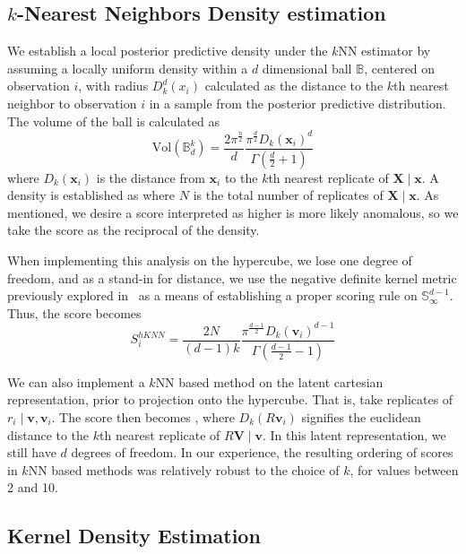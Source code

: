 \subsection{$k$-Nearest Neighbors Density estimation}
We establish a local posterior predictive density under the $k$NN estimator by 
  assuming a locally uniform density within a $d$ dimensional ball $\mathbb{B}$, 
  centered on observation $i$, with radius $D_{k}^d(x_i)$ calculated as the 
  distance to the $k$th nearest neighbor to observation $i$ in a sample from the 
  posterior predictive distribution. The volume of the ball is calculated as
  \begin{equation}
    \label{eq:vol_sphere}
    \text{Vol}(\mathbb{B}_d^k) = 
      \frac{2\pi^{\frac{n}{2}}}{d}
      \frac{\pi^{\frac{d}{2}}D_{k}(\bm{x}_i)^d}{\Gamma\left(\frac{d}{2} + 1\right)}
  \end{equation}
   where $D_k(\bm{x}_i)$ is the distance from 
  $\bm{x}_i$ to the $k$th nearest replicate of $\bm{X}\mid\bm{x}$.  A density is
  established as  where $N$ is the total number of 
  replicates of $\bm{X}\mid\bm{x}$.  As mentioned, we desire a score interpreted
  as higher is more likely anomalous, so we take the score as the reciprocal of 
  the density.

When implementing this analysis on the hypercube, we lose one degree of freedom,
  and as a stand-in for distance, we use the negative definite kernel metric 
  previously explored in~\cite{trubey:pg} as a means of establishing a proper 
  scoring rule on $\mathbb{S}_{\infty}^{d-1}$.  Thus, the score becomes
  \begin{equation}
    \label{eq:ad_knn_h}
    S_i^{hKNN} = \frac{2N}{(d-1)k}\frac{\pi^{\frac{d-1}{2}}D_{k}(\bm{v}_i)^{d-1}}{\Gamma\left(\frac{d-1}{2} - 1\right)}
  \end{equation}
  
  We can also implement a $k$NN based method on the latent cartesian
  representation, prior to projection onto the hypercube.  That is, take replicates
  of $r_i\mid \bm{v},\bm{v}_i$.  The score then becomes ,
  where $D_k(R\bm{v}_i)$ signifies the euclidean distance to the $k$th nearest
  replicate of $R\bm{V}\mid\bm{v}$.  In this latent representation, we still have
  $d$ degrees of freedom. In our experience, the resulting ordering of
  scores in $k$NN based methods was relatively robust to the choice of $k$, for 
  values between 2 and 10.

\subsection{Kernel Density Estimation}

